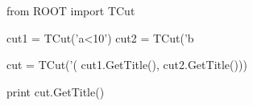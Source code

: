 \begin{footnotesize}
\begin{pyglist}[language=python,texcl=true,abovecaptionskip=0,style=vs,bgcolor=Moccasin]
from ROOT import TCut

cut1 = TCut('a<10')
cut2 = TCut('b%

cut = TCut('(%
    cut1.GetTitle(),
    cut2.GetTitle()))

print cut.GetTitle()
\end{pyglist}
\end{footnotesize}
